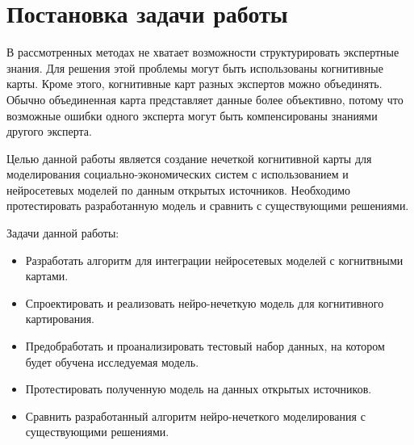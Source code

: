 \section{Постановка задачи работы}

В рассмотренных методах не хватает возможности структурировать экспертные знания.
Для решения этой проблемы могут быть использованы когнитивные карты.
Кроме этого, когнитивные карт разных экспертов можно объединять. Обычно
объединенная карта представляет данные более объективно, потому что возможные
ошибки одного эксперта могут быть компенсированы знаниями другого эксперта.

Целью данной работы является создание нечеткой когнитивной карты для моделирования
социально-экономических систем с использованием и нейросетевых моделей по данным открытых источников.
Необходимо протестировать разработанную модель и сравнить с существующими решениями.

Задачи данной работы:
\begin{itemize}
	\item Разработать алгоритм для интеграции нейросетевых моделей с когнитвными картами.
	\item Спроектировать и реализовать нейро-нечеткую модель для когнитивного картирования.
	\item Предобработать и проанализировать тестовый набор данных, на котором будет обучена исследуемая модель.
	\item Протестировать полученную модель на данных открытых источников.
	\item Сравнить разработанный алгоритм нейро-нечеткого моделирования с существующими решениями.
\end{itemize}


